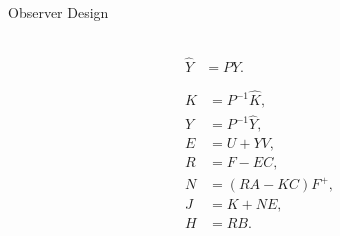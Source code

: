 \begin{slide}{Observer Design}
\begin{columns}[c]
\begin{column}{0.55\textwidth}
\begin{align}
\begin{split}
          \hat{Y} & = PY.
        \end{split} \\\nonumber\\
        \begin{split}
          K & = P^{-1}\hat{K},  \\
          Y & = P^{-1}\hat{Y},  \\
          E & = U + YV,         \\
          R & = F - EC,         \\
          N & = (RA - KC)F^{+}, \\
          J & = K + NE,         \\
          H & = RB.
        \end{split}
      \end{align}
    \end{column}%
  \end{columns}
\end{slide}

